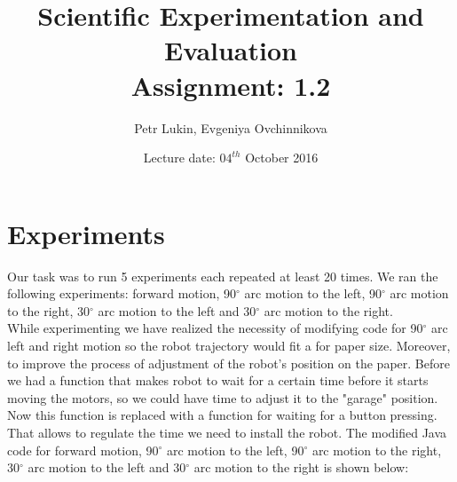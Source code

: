 \documentclass[a4paper, 12pt]{article}
\title{Scientific Experimentation and Evaluation  \\
				Assignment: 1.2}
\author{Petr Lukin, Evgeniya Ovchinnikova}
\date{Lecture date: $04^{th}$ October 2016}
\begin{document}
\maketitle

\section{Experiments}

Our task was to run 5 experiments each repeated at least 20 times. We ran the following experiments: forward motion, 90$^{\circ}$ arc motion to the left, 90$^{\circ}$ arc motion to the right, 30$^{\circ}$ arc motion to the left and 30$^{\circ}$ arc motion to the right.\\
While experimenting we have realized the necessity of modifying code for 90$^{\circ}$ arc left and right motion so the robot trajectory would fit a for paper size. Moreover, to improve the process of adjustment of the robot's position on the paper. Before we had a function that makes robot to wait for a certain time before it starts moving the motors, so we could have time to adjust it to the "garage" position. Now this function is replaced with a function for waiting for a button pressing. That allows to regulate the time we need to install the robot. The modified Java code for forward motion, 90$^{\circ}$ arc motion to the left, 90$^{\circ}$ arc motion to the right, 30$^{\circ}$ arc motion to the left and 30$^{\circ}$ arc motion to the right is shown below:
\end{document}
